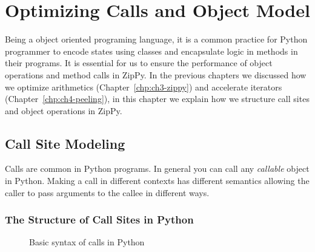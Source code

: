 \chapter{Optimizing Calls and Object Model}
\label{chp:ch5-object}

Being a object oriented programing language, it is a common practice for Python programmer to encode states using classes and encapsulate logic in methods in their programs.
It is essential for us to ensure the performance of object operations and method calls in ZipPy.
In the previous chapters we discussed how we optimize arithmetics (Chapter~\ref{chp:ch3-zippy}) and accelerate iterators (Chapter~\ref{chp:ch4-peeling}),
in this chapter we explain how we structure call sites and object operations in ZipPy.

\section{Call Site Modeling}

Calls are common in Python programs.
In general you can call any \emph{callable} object in Python.
Making a call in different contexts has different semantics allowing the caller to pass arguments to the callee in different ways.

\subsection{The Structure of Call Sites in Python}
\label{sec:ch5-structure-of-call-sites}

\begin{figure}
\centering
{}
\caption{Basic syntax of calls in Python}
\label{fig:ch5-call-site-synteax-code}
\end{figure}

